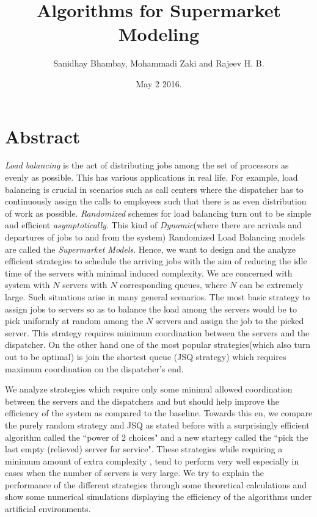 \documentclass[a4paper,english,12pt]{article}
\title{Algorithms for Supermarket Modeling}
\date{May 2 2016.}
\author{Sanidhay Bhambay, Mohammadi Zaki and Rajeev H. B.}
\begin{document}
\maketitle

\section{Abstract}
\textit{Load balancing} is the act of distributing jobs among the set of processors as evenly as possible. This has various applications in real life. For example, load balancing is crucial in scenarios such as call centers where the dispatcher has to continuously assign the calls to  employees such that there is as even distribution of work as possible. \textit{Randomized} schemes for load balancing turn out to be simple and efficient \textit{asymptotically}. This kind of \textit{Dynamic}(where there are arrivals and departures of jobs to and from the system) Randomized Load Balancing models are called the \textit{Supermarket Models}. Hence, we want to design and the analyze efficient strategies to schedule the arriving jobs with the aim of reducing the idle time of the servers with minimal induced complexity. We are concerned with system with $N$ servers with $N$ corresponding queues, where $N$ can be extremely large. Such situations arise in many general scenarios. The most basic strategy to assign jobs to servers so as to balance the load among the servers would be to pick uniformly at random among the $N$ servers and assign the job to the picked server. This strategy requires minimum coordination between the servers and the dispatcher. On the other hand one of the most popular strategies(which also turn out to be optimal) is join the shortest queue (JSQ strategy) which requires maximum coordination on the dispatcher's end.
\par We analyze strategies which  require only some  minimal allowed  coordination between the servers and the dispatchers and but should help improve the efficiency of the system as compared to the baseline. Towards this en, we compare the purely random strategy and JSQ as stated before with a surprisingly efficient algorithm called the ``power of 2 choices" and a new startegy called the ``pick the last empty (relieved) server for service". These strategies while requiring a minimum amount of extra complexity , tend to perform very well especially in cases when the number of servers is very large. We try to explain the performance of the different strategies through some theoretical calculations and show some numerical simulations displaying the efficiency of the algorithms under artificial environments. 
\end{document}
